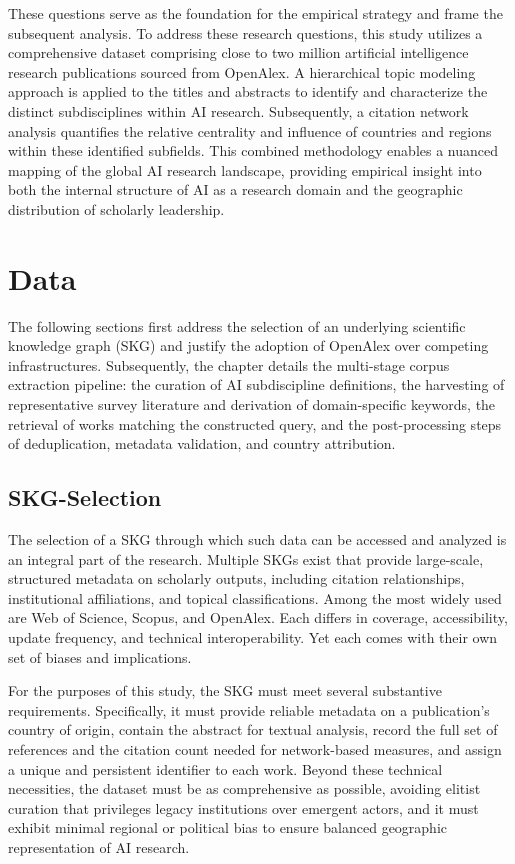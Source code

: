 \documentclass{article}
\begin{document}
These questions serve as the foundation for the empirical strategy and frame the subsequent analysis. To address these research questions, this study utilizes a comprehensive dataset comprising close to two million artificial intelligence research publications sourced from OpenAlex. \cite{openalex2023} A hierarchical topic modeling approach is applied to the titles and abstracts to identify and characterize the distinct subdisciplines within AI research. Subsequently, a citation network analysis quantifies the relative centrality and influence of countries and regions within these identified subfields. This combined methodology enables a nuanced mapping of the global AI research landscape, providing empirical insight into both the internal structure of AI as a research domain and the geographic distribution of scholarly leadership.

\section{Data}


The following sections first address the selection of an underlying scientific knowledge graph (SKG) and justify the adoption of OpenAlex over competing infrastructures. Subsequently, the chapter details the multi-stage corpus extraction pipeline: the curation of AI subdiscipline definitions, the harvesting of representative survey literature and derivation of domain-specific keywords, the retrieval of works matching the constructed query, and the post-processing steps of deduplication, metadata validation, and country attribution.


\subsection{SKG-Selection}

The selection of a SKG through which such data can be accessed and analyzed is an integral part of the research. Multiple SKGs exist that provide large-scale, structured metadata on scholarly outputs, including citation relationships, institutional affiliations, and topical classifications. Among the most widely used are Web of Science, Scopus, and OpenAlex. Each differs in coverage, accessibility, update frequency, and technical interoperability. Yet each comes with their own set of biases and implications.

For the purposes of this study, the SKG must meet several substantive requirements. Specifically, it must provide reliable metadata on a publication’s country of origin, contain the abstract for textual analysis, record the full set of references and the citation count needed for network-based measures, and assign a unique and persistent identifier to each work. Beyond these technical necessities, the dataset must be as comprehensive as possible, avoiding elitist curation that privileges legacy institutions over emergent actors, and it must exhibit minimal regional or political bias to ensure balanced geographic representation of AI research.
\end{document}
